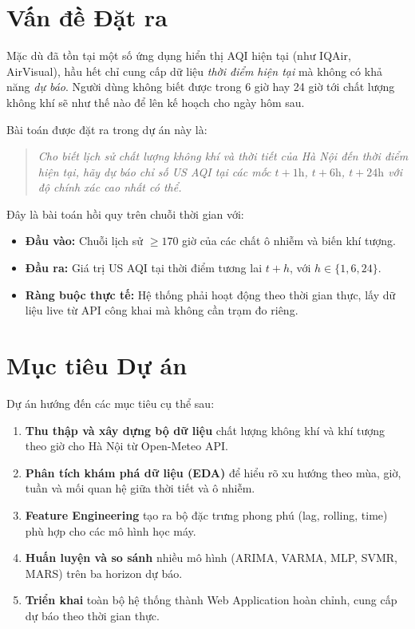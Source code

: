 \documentclass[12pt,a4paper]{report}
\begin{document}
\section{Vấn đề Đặt ra}

Mặc dù đã tồn tại một số ứng dụng hiển thị AQI hiện tại (như IQAir, AirVisual), hầu hết chỉ cung cấp dữ liệu \textit{thời điểm hiện tại} mà không có khả năng \textit{dự báo}. Người dùng không biết được trong 6 giờ hay 24 giờ tới chất lượng không khí sẽ như thế nào để lên kế hoạch cho ngày hôm sau.

Bài toán được đặt ra trong dự án này là:

\begin{quote}
\textit{Cho biết lịch sử chất lượng không khí và thời tiết của Hà Nội đến thời điểm hiện tại, hãy dự báo chỉ số US AQI tại các mốc $t+1\text{h}$, $t+6\text{h}$, $t+24\text{h}$ với độ chính xác cao nhất có thể.}
\end{quote}

Đây là bài toán hồi quy trên chuỗi thời gian với:
\begin{itemize}
  \item \textbf{Đầu vào:} Chuỗi lịch sử $\geq 170$ giờ của các chất ô nhiễm và biến khí tượng.
  \item \textbf{Đầu ra:} Giá trị US AQI tại thời điểm tương lai $t+h$, với $h \in \{1, 6, 24\}$.
  \item \textbf{Ràng buộc thực tế:} Hệ thống phải hoạt động theo thời gian thực, lấy dữ liệu live từ API công khai mà không cần trạm đo riêng.
\end{itemize}

\section{Mục tiêu Dự án}

Dự án hướng đến các mục tiêu cụ thể sau:

\begin{enumerate}
  \item \textbf{Thu thập và xây dựng bộ dữ liệu} chất lượng không khí và khí tượng theo giờ cho Hà Nội từ Open-Meteo API.
  \item \textbf{Phân tích khám phá dữ liệu (EDA)} để hiểu rõ xu hướng theo mùa, giờ, tuần và mối quan hệ giữa thời tiết và ô nhiễm.
  \item \textbf{Feature Engineering} tạo ra bộ đặc trưng phong phú (lag, rolling, time) phù hợp cho các mô hình học máy.
  \item \textbf{Huấn luyện và so sánh} nhiều mô hình (ARIMA, VARMA, MLP, SVMR, MARS) trên ba horizon dự báo.
  \item \textbf{Triển khai} toàn bộ hệ thống thành Web Application hoàn chỉnh, cung cấp dự báo theo thời gian thực.
\end{enumerate}
\end{document}
